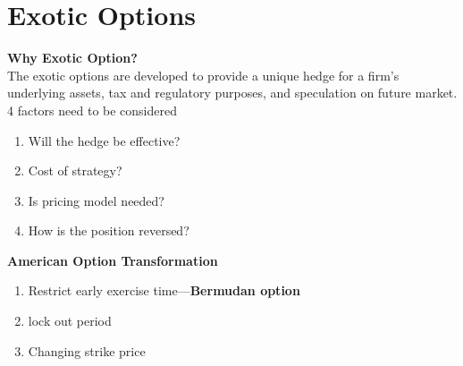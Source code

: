 \documentclass[11pt,fleqn]{book} %
\numberwithin{equation}{section} %
\numberwithin{figure}{section} %
\numberwithin{table}{section} %
\begin{document}
\chapter{Exotic Options}
\begin{definition}\textbf{Why Exotic Option?}\\
The exotic options are developed to provide a unique hedge for a firm's underlying assets, tax and regulatory purposes, and speculation on future market. 4 factors need to be considered
\begin{enumerate}
    \item Will the hedge be effective?
    \item Cost of strategy?
    \item Is pricing model needed?
    \item How is the position reversed?
\end{enumerate}
\end{definition}
\begin{definition}\textbf{American Option Transformation}
\begin{enumerate}
    \item Restrict early exercise time---\textbf{Bermudan option}
    \item lock out period
    \item Changing strike price
\end{enumerate}
\end{definition}
\end{document}
